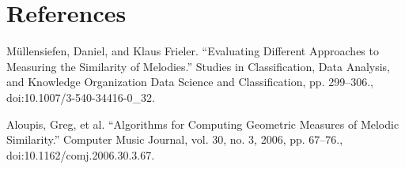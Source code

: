 \documentclass{article}
\begin{document}
	\section{References}
 	Müllensiefen, Daniel, and Klaus Frieler. “Evaluating Different Approaches to Measuring the Similarity of Melodies.” Studies in Classification, Data Analysis, and Knowledge Organization Data Science and Classification, pp. 299–306., doi:10.1007/3-540-34416-0\_32.
	\newline
	
	\noindent
	Aloupis, Greg, et al. “Algorithms for Computing Geometric Measures of Melodic Similarity.” Computer Music Journal, vol. 30, no. 3, 2006, pp. 67–76., doi:10.1162/comj.2006.30.3.67.
	
\end{document}
